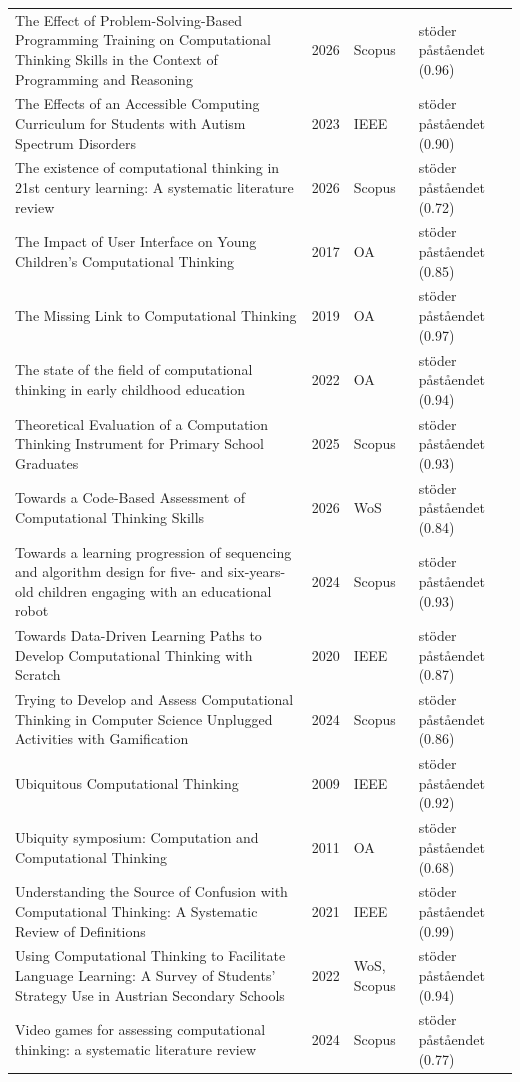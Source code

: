 \begin{longtable}{@{}%
  >{\raggedright\arraybackslash}p{}c%
  >{\raggedright\arraybackslash}p{}%
  >{\raggedright\arraybackslash}p{}@{}}
The Effect of Problem-Solving-Based Programming Training on Computational Thinking Skills in the Context of Programming and Reasoning & 2026 & Scopus & stöder påståendet (0.96) \\
The Effects of an Accessible Computing Curriculum for Students with Autism Spectrum Disorders & 2023 & IEEE & stöder påståendet (0.90) \\
The existence of computational thinking in 21st century learning: A systematic literature review & 2026 & Scopus & stöder påståendet (0.72) \\
The Impact of User Interface on Young Children's Computational Thinking & 2017 & OA & stöder påståendet (0.85) \\
The Missing Link to Computational Thinking & 2019 & OA & stöder påståendet (0.97) \\
The state of the field of computational thinking in early childhood education & 2022 & OA & stöder påståendet (0.94) \\
Theoretical Evaluation of a Computation Thinking Instrument for Primary School Graduates & 2025 & Scopus & stöder påståendet (0.93) \\
Towards a Code-Based Assessment of Computational Thinking Skills & 2026 & WoS & stöder påståendet (0.84) \\
Towards a learning progression of sequencing and algorithm design for five- and six-years-old children engaging with an educational robot & 2024 & Scopus & stöder påståendet (0.93) \\
Towards Data-Driven Learning Paths to Develop Computational Thinking with Scratch & 2020 & IEEE & stöder påståendet (0.87) \\
Trying to Develop and Assess Computational Thinking in Computer Science Unplugged Activities with Gamification & 2024 & Scopus & stöder påståendet (0.86) \\
Ubiquitous Computational Thinking & 2009 & IEEE & stöder påståendet (0.92) \\
Ubiquity symposium: Computation and Computational Thinking & 2011 & OA & stöder påståendet (0.68) \\
Understanding the Source of Confusion with Computational Thinking: A Systematic Review of Definitions & 2021 & IEEE & stöder påståendet (0.99) \\
Using Computational Thinking to Facilitate Language Learning: A Survey of Students' Strategy Use in Austrian Secondary Schools & 2022 & WoS, Scopus & stöder påståendet (0.94) \\
Video games for assessing computational thinking: a systematic literature review & 2024 & Scopus & stöder påståendet (0.77) \\

\end{longtable}
